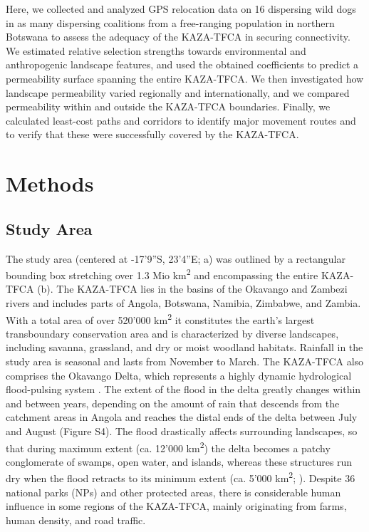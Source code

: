 \documentclass[abstract=on,10pt,a4paper,bibliography=totocnumbered]{article}
\begin{document}
Here, we collected and analyzed GPS relocation data on 16 dispersing wild dogs
in as many dispersing coalitions from a free-ranging population in northern
Botswana to assess the adequacy of the KAZA-TFCA in securing connectivity. We
estimated relative selection strengths towards environmental and anthropogenic
landscape features, and used the obtained coefficients to predict a permeability
surface spanning the entire KAZA-TFCA. We then investigated how landscape
permeability varied regionally and internationally, and we compared permeability
within and outside the KAZA-TFCA boundaries. Finally, we calculated least-cost
paths and corridors to identify major movement routes and to verify that these
were successfully covered by the KAZA-TFCA.

\section{Methods}
\subsection{Study Area}
The study area (centered at -17'9''S, 23'4''E;
a) was outlined by a rectangular bounding box stretching over
1.3 Mio km\textsuperscript{2} and encompassing the entire KAZA-TFCA
(b). The KAZA-TFCA lies in the basins of the Okavango and
Zambezi rivers and includes parts of Angola, Botswana, Namibia, Zimbabwe, and
Zambia. With a total area of over 520'000 km\textsuperscript{2} it constitutes
the earth's largest transboundary conservation area and is characterized by
diverse landscapes, including savanna, grassland, and dry or moist woodland
habitats. Rainfall in the study area is seasonal and lasts from November to
March. The KAZA-TFCA also comprises the Okavango Delta, which represents a
highly dynamic hydrological flood-pulsing system \citep{McNutt.1996,
Wolski.2017}. The extent of the flood in the delta greatly changes within and
between years, depending on the amount of rain that descends from the catchment
areas in Angola and reaches the distal ends of the delta between July and August
(Figure S4). The flood drastically affects surrounding landscapes, so that
during maximum extent (ca. 12'000 km\textsuperscript{2}) the delta becomes a
patchy conglomerate of swamps, open water, and islands, whereas these structures
run dry when the flood retracts to its minimum extent (ca. 5'000
km\textsuperscript{2}; \citealp{Wolski.2017}). Despite 36 national parks (NPs)
and other protected areas, there is considerable human influence in some regions
of the KAZA-TFCA, mainly originating from farms, human density, and road
traffic.
\end{document}
